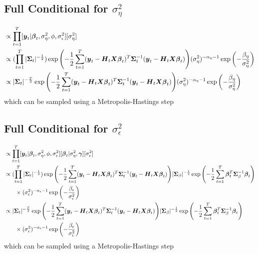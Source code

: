 \documentclass[fleqn]{article}
\def\bm#1{\mbox{\boldmath $#1$}}
\begin{document}
\subsection{Full Conditional for $\sigma^2_\eta$}
%
\begin{align*}
[\sigma^2_\eta | \cdot] & \propto \prod_{t = 1}^T [\bm{y}_t | \bm{\beta}_t, \sigma^2_\eta, \phi, \sigma^2_\epsilon] [\sigma^2_\eta]\\
%
& \propto (\prod_{t = 1}^T |\bm{\Sigma}_t |^{ - \frac{1} {2}}) \exp{ \left( - \frac{1} {2} \sum_{t = 1}^T (\bm{y}_t - \bm{H}_t \bm{X} \bm{\beta}_t)^T \bm{\Sigma}_t^{ - 1} (\bm{y}_t - \bm{H}_t \bm{X} \bm{\beta}_t) \right) } (\sigma^2_\eta)^{ - \alpha_\eta - 1} \exp{ \left( - \frac{\beta_\eta} {\sigma^2_\eta} \right) }\\
%
& \propto |\bm{\Sigma}_t |^{ - \frac{T} {2}} \exp{ \left( - \frac{1} {2} \sum_{t = 1}^T (\bm{y}_t - \bm{H}_t \bm{X} \bm{\beta}_t)^T \bm{\Sigma}_t^{ - 1} (\bm{y}_t - \bm{H}_t \bm{X} \bm{\beta}_t) \right) } (\sigma^2_\eta)^{ - \alpha_\eta - 1} \exp{ \left( - \frac{\beta_\eta} {\sigma^2_\eta} \right) }\\
\end{align*}
% 
which can be sampled using a Metropolis-Hastings step
%
\subsection{Full Conditional for $\sigma^2_\epsilon$}
%
\begin{align*}
[\sigma^2_\epsilon | \cdot] & \propto \prod_{t = 1}^T [\bm{y}_t | \bm{\beta}_t, \sigma^2_\eta, \phi, \sigma^2_\epsilon] [\bm{\beta}_t | \sigma^2_\eta, \bm{\gamma}] [\sigma^2_\epsilon]\\
%
& \propto (\prod_{t = 1}^T |\bm{\Sigma}_t |^{ - \frac{1} {2}}) \exp{ \left( - \frac{1} {2} \sum_{t = 1}^T (\bm{y}_t - \bm{H}_t \bm{X} \bm{\beta}_t)^T \bm{\Sigma}_t^{ - 1} (\bm{y}_t - \bm{H}_t \bm{X} \bm{\beta}_t) \right) } |\bm{\Sigma}_\beta |^{ - \frac{1} {2}} \exp{ \left( - \frac{1} {2} \sum_{t = 1}^T \bm{\beta}_t^T \bm{\Sigma}_{\beta}^{ - 1} \bm{\beta}_t \right) }\\
& \phantom{{}=1} \times (\sigma^2_\epsilon)^{ - \alpha_\epsilon - 1} \exp{ \left( - \frac{\beta_\epsilon} {\sigma^2_\epsilon} \right) }\\
%
& \propto |\bm{\Sigma}_t |^{ - \frac{T} {2}} \exp{ \left( - \frac{1} {2} \sum_{t = 1}^T (\bm{y}_t - \bm{H}_t \bm{X} \bm{\beta}_t)^T \bm{\Sigma}_t^{ - 1} (\bm{y}_t - \bm{H}_t \bm{X} \bm{\beta}_t) \right) } |\bm{\Sigma}_\beta |^{ - \frac{1} {2}} \exp{ \left( - \frac{1} {2} \sum_{t = 1}^T \bm{\beta}_t^T \bm{\Sigma}_{\beta}^{ - 1} \bm{\beta}_t \right) }\\
& \phantom{{}=1} \times (\sigma^2_\epsilon)^{ - \alpha_\epsilon - 1} \exp{ \left( - \frac{\beta_\epsilon} {\sigma^2_\epsilon} \right) }\\
\end{align*}
% 
which can be sampled using a Metropolis-Hastings step
%
\end{document}
